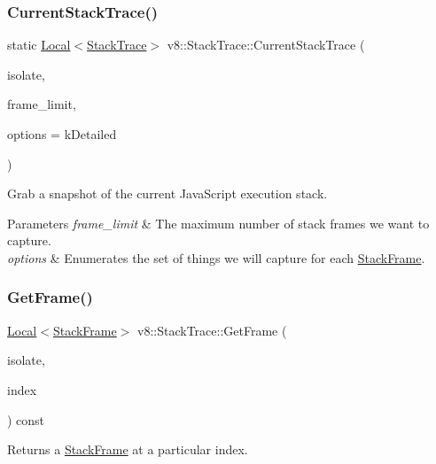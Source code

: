 \subsubsection{\texorpdfstring{Current\+Stack\+Trace()}{CurrentStackTrace()}}
{\footnotesize\ttfamily static \mbox{\hyperlink{classv8_1_1Local}{Local}}$<$\mbox{\hyperlink{classv8_1_1StackTrace}{Stack\+Trace}}$>$ v8\+::\+Stack\+Trace\+::\+Current\+Stack\+Trace (\begin{DoxyParamCaption}\item[{Isolate $\ast$}]{isolate,  }\item[{int}]{frame\+\_\+limit,  }\item[{\mbox{\hyperlink{classv8_1_1StackTrace_a9704e4a37949eb8eb8ccddbddf161492}{Stack\+Trace\+Options}}}]{options = {\ttfamily kDetailed} }\end{DoxyParamCaption})\hspace{0.3cm}{\ttfamily [static]}}

Grab a snapshot of the current Java\+Script execution stack.


\begin{DoxyParams}{Parameters}
{\em frame\+\_\+limit} & The maximum number of stack frames we want to capture. \\
\hline
{\em options} & Enumerates the set of things we will capture for each \mbox{\hyperlink{classv8_1_1StackFrame}{Stack\+Frame}}. \\
\hline
\end{DoxyParams}
\mbox{\label{classv8_1_1StackTrace_a62d9e32ccc7706716de7c7fd66a18726}} 
\subsubsection{\texorpdfstring{Get\+Frame()}{GetFrame()}}
{\footnotesize\ttfamily \mbox{\hyperlink{classv8_1_1Local}{Local}}$<$\mbox{\hyperlink{classv8_1_1StackFrame}{Stack\+Frame}}$>$ v8\+::\+Stack\+Trace\+::\+Get\+Frame (\begin{DoxyParamCaption}\item[{Isolate $\ast$}]{isolate,  }\item[{uint32\+\_\+t}]{index }\end{DoxyParamCaption}) const}

Returns a \mbox{\hyperlink{classv8_1_1StackFrame}{Stack\+Frame}} at a particular index. \mbox{\label{classv8_1_1StackTrace_a97a2010fa998f963df290062a8157849}} 
